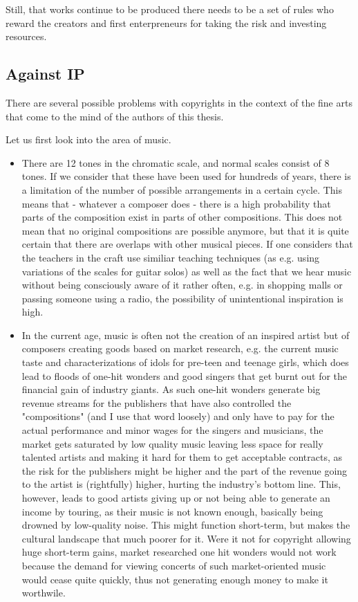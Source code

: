 \documentclass[a4paper]{report}
\begin{document}
Still, that works continue to be produced there needs to be a set of rules who reward the creators and first enterpreneurs for taking the risk and investing resources.

\subsection{Against IP}
There are several possible problems with copyrights in the context of the fine arts that come to the mind of the authors of this thesis. 

Let us first look into the area of music.
\begin{itemize}
	\item There are 12 tones in the chromatic scale, and normal scales consist of 8 tones. If we consider that these have been used for hundreds of years, there is a limitation of the number of possible arrangements in a certain cycle. This means that - whatever a composer does - there is a high probability that parts of the composition exist in parts of other compositions. This does not mean that no original compositions are possible anymore, but that it is quite certain that there are overlaps with other musical pieces. If one considers that the teachers in the craft use similiar teaching techniques (as e.g. using variations of the scales for guitar solos) as well as the fact that we hear music without being consciously aware of it rather often, e.g. in shopping malls or passing someone using a radio, the possibility of unintentional inspiration is high. 
	\item In the current age, music is often not the creation of an inspired artist but of composers creating goods based on market research, e.g. the current music taste and characterizations of idols for pre-teen and teenage girls, which does lead to floods of one-hit wonders and good singers that get burnt out for the financial gain of industry giants. As such one-hit wonders generate big revenue streams for the publishers that have also controlled the "compositions" (and I use that word loosely) and only have to pay for the actual performance and minor wages for the singers and musicians, the market gets saturated by low quality music leaving less space for really talented artists and making it hard for them to get acceptable contracts, as the risk for the publishers might be higher and the part of the revenue going to the artist is (rightfully) higher, hurting the industry's bottom line. This, however, leads to good artists giving up or not being able to generate an income by touring, as their music is not known enough, basically being drowned by low-quality noise. This might function short-term, but makes the cultural landscape that much poorer for it. Were it not for copyright allowing huge short-term gains, market researched one hit wonders would not work because the demand for viewing concerts of such market-oriented music would cease quite quickly, thus not generating enough money to make it worthwile.
\end{itemize}
\end{document}
